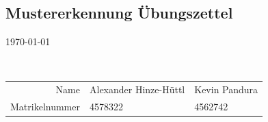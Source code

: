 \documentclass[a4paper,10pt]{article}
\begin{document}
\begin{center}
    \section*{Mustererkennung Übungszettel}
     \today
\end{center}
$ $
\newline
\begin{tabular}{r|l l}
    Name & Alexander Hinze-Hüttl & Kevin Pandura\\
    Matrikelnummer & 4578322 & 4562742\\
\end{tabular}
\newline
$ $
\newline
\newline
\end{document}
